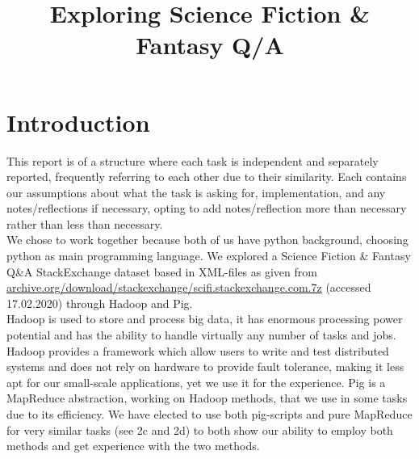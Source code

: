\documentclass[fleqn,10pt]{wlscirep}
\title{Exploring Science Fiction \& Fantasy Q/A}
\author{}
\begin{document}







\flushbottom
\maketitle


\section{Introduction}
This report is of a structure where each task is independent and separately reported, frequently referring to each other due to their similarity. Each contains our assumptions about what the task is asking for, implementation, and any notes/reflections if necessary, opting to add notes/reflection more than necessary rather than less than necessary.\\

We chose to work together because both of us have python background, choosing python as main programming language. We explored a Science Fiction \& Fantasy Q\&A StackExchange dataset based in XML-files as given from \url{archive.org/download/stackexchange/scifi.stackexchange.com.7z} (accessed 17.02.2020) through Hadoop and Pig.\\
Hadoop is used to store and process big data, it has enormous processing power potential and has the ability to handle virtually any number of tasks and jobs. Hadoop provides a framework which allow users to write and test distributed systems and does not rely on hardware to provide fault tolerance, making it less apt for our small-scale applications, yet we use it for the experience. Pig is a MapReduce abstraction, working on Hadoop methods, that we use in some tasks due to its efficiency. We have elected to use both pig-scripts and pure MapReduce for very similar tasks (see 2c and 2d) to both show our ability to employ both methods and get experience with the two methods.
\end{document}
